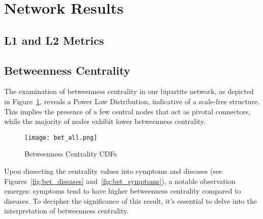 \section{Network Results}
\subsection{L1 and L2 Metrics}


\subsection{Betweenness Centrality}
The examination of betweenness centrality in our bipartite network, as depicted in Figure~\ref{fig:bet_all},
reveals a Power Law Distribution, indicative of a scale-free structure. This implies the presence of a few central
nodes that act as pivotal connectors, while the majority of nodes exhibit lower betweenness centrality.

\begin{figure}[H]
    \centering
    \texttt{[image: bet\_all.png]}
    \caption{Betweenness Centrality CDFs}
    \label{fig:bet_all}
\end{figure}
\noindent
Upon dissecting the centrality values into symptoms and diseases (see Figures~\ref{fig:bet_diseases} and~\ref{fig:bet_symptoms}),
a notable observation emerges: symptoms tend to have higher betweenness centrality compared to diseases. To decipher the
significance of this result, it's essential to delve into the interpretation of betweenness centrality.

